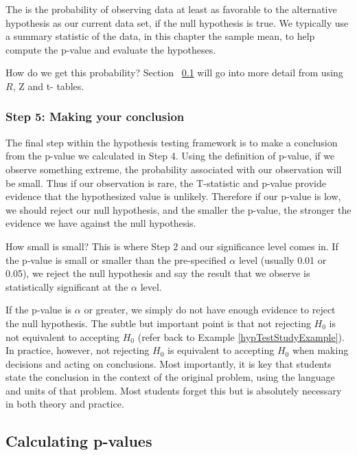 \begin{termBox}{
The  is the probability of observing data at least as favorable to the alternative hypothesis as our current data set, if the null hypothesis is true. We typically use a summary statistic of the data, in this chapter the sample mean, to help compute the p-value and evaluate the hypotheses.}
\end{termBox}

How do we get this probability? Section ~\ref{pValue} will go into more detail from using $R$, Z and t- tables. 

\subsubsection{Step 5: Making your conclusion}
The final step within the hypothesis testing framework is to make a conclusion from the p-value we calculated in Step 4. Using the definition of p-value, if we observe something extreme, the probability associated with our observation will be small. Thus if our observation is rare, the T-statistic and p-value provide evidence that the hypothesized value is unlikely. Therefore if our p-value is low, we should reject our null hypothesis, and the smaller the p-value, the stronger the evidence we have against the null hypothesis. 

How small is small? This is where Step 2 and our significance level comes in. If the p-value is small or smaller than the pre-specified $\alpha$ level (usually 0.01 or 0.05),  we reject the null hypothesis and say the result that we observe is statistically significant at the $\alpha$ level. 

If the p-value is $\alpha$ or greater, we simply do not have enough evidence to reject the null hypothesis. The subtle but important point is that not rejecting $H_0$ is not equivalent to accepting $H_0$ (refer back to Example \ref{hypTestStudyExample}). In practice, however, not rejecting $H_0$ is equivalent to accepting $H_0$ when making decisions and acting on conclusions. Most importantly, it is key that students state the conclusion in the context of the original problem, using the language and units of that problem. Most students forget this but is absolutely necessary in both theory and practice. 


\subsection{Calculating p-values}
\label{pValue}

